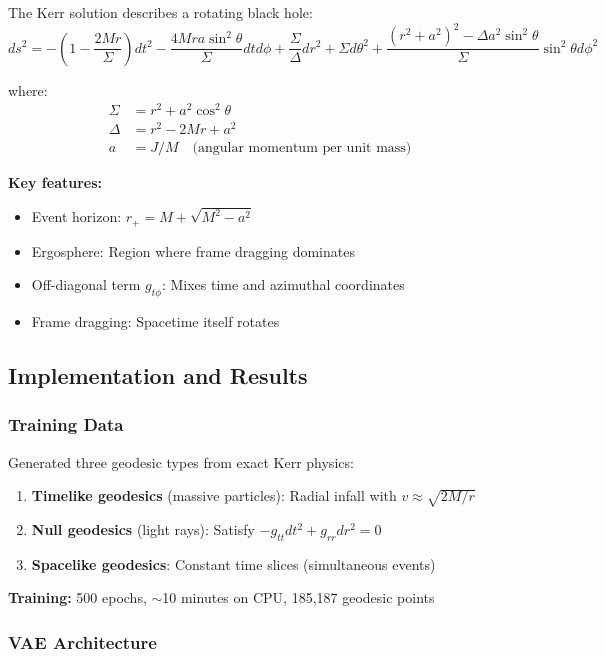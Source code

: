 \documentclass[11pt,a4paper]{article}
\begin{document}
The Kerr solution describes a rotating black hole:
\begin{equation}
ds^2 = -\left(1 - \frac{2Mr}{\Sigma}\right)dt^2 - \frac{4Mra\sin^2\theta}{\Sigma}dtd\phi + \frac{\Sigma}{\Delta}dr^2 + \Sigma d\theta^2 + \frac{(r^2+a^2)^2 - \Delta a^2\sin^2\theta}{\Sigma}\sin^2\theta d\phi^2
\end{equation}

where:
\begin{align}
\Sigma &= r^2 + a^2\cos^2\theta \\
\Delta &= r^2 - 2Mr + a^2 \\
a &= J/M \quad \text{(angular momentum per unit mass)}
\end{align}

\textbf{Key features:}
\begin{itemize}
\item Event horizon: $r_+ = M + \sqrt{M^2 - a^2}$
\item Ergosphere: Region where frame dragging dominates
\item Off-diagonal term $g_{t\phi}$: Mixes time and azimuthal coordinates
\item Frame dragging: Spacetime itself rotates
\end{itemize}

\subsection{Implementation and Results}

\subsubsection{Training Data}

Generated three geodesic types from exact Kerr physics:

\begin{enumerate}
\item \textbf{Timelike geodesics} (massive particles): Radial infall with $v \approx \sqrt{2M/r}$
\item \textbf{Null geodesics} (light rays): Satisfy $-g_{tt}dt^2 + g_{rr}dr^2 = 0$
\item \textbf{Spacelike geodesics}: Constant time slices (simultaneous events)
\end{enumerate}

\textbf{Training:} 500 epochs, $\sim$10 minutes on CPU, 185,187 geodesic points

\subsubsection{VAE Architecture}
\end{document}
